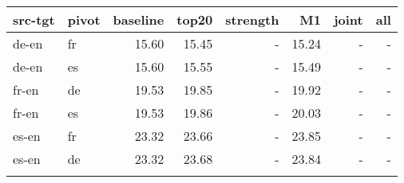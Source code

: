 \begin{tabular}{llrrrrrr}
\toprule
src-tgt & pivot & baseline & top20 & strength & M1 & joint & all \\
\toprule
de-en & fr & 15.60 & 15.45 & - & 15.24 & - & -  \\
de-en & es & 15.60 & 15.55 & - & 15.49 & - & - \\
fr-en & de & 19.53 & 19.85 & - & 19.92 & - & - \\
fr-en & es & 19.53 & 19.86 & - & 20.03 & - & - \\
es-en & fr & 23.32 & 23.66 & - & 23.85 & - & - \\
es-en & de & 23.32 & 23.68 & - & 23.84 & - & - \\
\bottomrule
\centering
\small
\label{table:eparlintertopn}
\end{tabular}